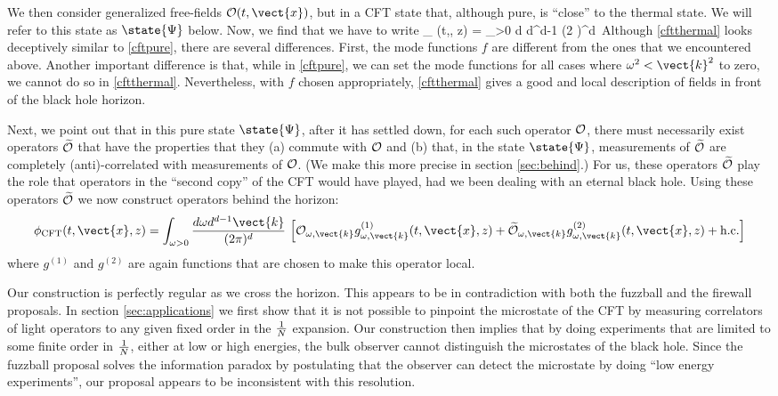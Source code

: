 We then consider generalized free-fields ${\cal O}(t,\vect{x})$, but in a CFT state that, although pure, is ``close'' to the thermal state. We will refer to this state as $\state{\Psi}$ below. Now, we find that we have to write
\be
\label{cftthermal}
\phi_{} (t,, z) = \int_{\omega>0} {d \omega  d^{d-1}  \over (2 \pi)^d}\,
\ee
Although \eqref{cftthermal} looks deceptively similar to \eqref{cftpure}, there are several differences. First, the mode functions $f$ are different from the ones that we encountered above. Another important difference is that, while in \eqref{cftpure}, we can set the mode functions for all cases where $\omega^2 < \vect{k}^2$ to zero, we cannot do so in \eqref{cftthermal}. Nevertheless, with $f$ chosen appropriately, \eqref{cftthermal} gives a good  and local description of fields in front of the black hole horizon.

Next, we point out that in this pure state $\state{\Psi}$, after it has settled down, for each such operator ${\cal O}$, there must necessarily exist operators $\widetilde{\cal O}$ that have the properties that they (a) commute with ${\cal O}$ and (b) that, in the state $\state{\Psi}$, measurements of $\widetilde{\cal O}$ are completely (anti)-correlated with measurements of ${\cal O}$. (We make this more precise in section \ref{sec:behind}.) For us, these operators $\widetilde{\cal O}$ play the role that operators in the ``second copy'' of the CFT would have played, had we been dealing with an eternal black hole.  Using these operators $\widetilde{\cal O}$ we now construct operators behind the horizon: 
\[ 
\phi_{\text{CFT}}(t,\vect{x},z) =
\int_{\omega>0} {d\omega d^{d-1}\vect{k}  \over (2 \pi)^d}\, \left[ {\cal O}_{\omega,\vect{k}} g_{\omega,\vect{k}}^{(1)}(t,\vect{x},z) + \widetilde{\cal O}_{\omega,\vect{k}} g_{\omega,\vect{k}}^{(2)}(t,\vect{x},z)+ \text{h.c.}
\right]
 \]
where $g^{(1)}$ and $g^{(2)}$ are again functions that are chosen to make 
this operator local.  

Our construction is perfectly regular as we cross the horizon. This appears to be in contradiction with both the fuzzball and the firewall proposals.  In section \ref{sec:applications} we first show that it is not possible to pinpoint the microstate of the CFT by measuring correlators of light operators to any given fixed order in the ${1 \over N}$ expansion. Our construction then implies that by doing experiments that are limited to some finite order in ${1 \over N}$, either at low or high energies, the bulk observer cannot distinguish the microstates of the black hole. Since the fuzzball proposal solves the information paradox by postulating that the observer can detect the microstate by doing ``low energy experiments'', our proposal appears to be inconsistent with this resolution.

